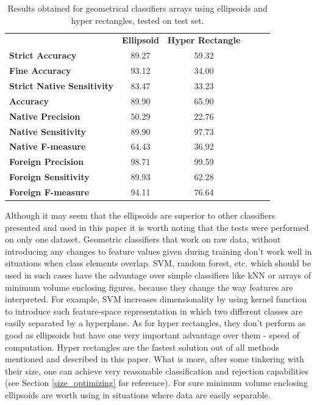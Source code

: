 \begin{table}[htp]
	\centering
	\caption{Results obtained for geometrical classifiers arrays using ellipsoids and hyper rectangles, tested on test set.}
	\label{ellipsoid_arrays_results_test}
	\begin{tabular}{l|c|c|lll}
		\cline{2-3}
		& \multicolumn{1}{l|}{\textbf{Ellipsoid}} & \textbf{Hyper Rectangle} &  &  &  \\ \cline{1-3}
		\multicolumn{1}{|l|}{\textbf{Strict Accuracy}}           & 89.27 & 59.32 \\ \cline{1-3}
		\multicolumn{1}{|l|}{\textbf{Fine Accuracy}}             & 93.12 & 34.00 \\ \cline{1-3}
		\multicolumn{1}{|l|}{\textbf{Strict Native Sensitivity}} & 83.47 & 33.23 \\ \cline{1-3}
		\multicolumn{1}{|l|}{\textbf{Accuracy}}                  & 89.90 & 65.90 \\ \cline{1-3}
		\multicolumn{1}{|l|}{\textbf{Native Precision}}          & 50.29 & 22.76 \\ \cline{1-3}
		\multicolumn{1}{|l|}{\textbf{Native Sensitivity}}        & 89.90 & 97.73 \\ \cline{1-3}
		\multicolumn{1}{|l|}{\textbf{Native F-measure}}          & 64.43 & 36.92 \\ \cline{1-3}
		\multicolumn{1}{|l|}{\textbf{Foreign Precision}}         & 98.71 & 99.59 \\ \cline{1-3}
		\multicolumn{1}{|l|}{\textbf{Foreign Sensitivity}}       & 89.93 & 62.28 \\ \cline{1-3}
		\multicolumn{1}{|l|}{\textbf{Foreign F-measure}}         & 94.11 & 76.64 \\ \cline{1-3}
	\end{tabular}
\end{table}

Although it may seem that the ellipsoids are superior to other classifiers presented and used in this paper it is worth noting that the tests were performed on only one dataset. Geometric classifiers that work on raw data, without introducing any changes to feature values given during training don't work well in situations when class elements overlap. SVM, random forest, etc. which should be used in such cases have the advantage over simple classifiers like kNN or arrays of minimum volume enclosing figures, because they change the way features are interpreted. For example, SVM increases dimensionality by using kernel function to introduce such feature-space representation in which two different classes are easily separated by a hyperplane. As for hyper rectangles, they don't perform as good as ellipsoids but have one very important advantage over them - speed of computation. Hyper rectangles are the fastest solution out of all methods mentioned and described in this paper. What is more, after some tinkering with their size, one can achieve very reasonable classification and rejection capabilities (see Section \ref{size_optimizing} for reference). For sure minimum volume enclosing ellipsoids are worth using in situations where data are easily separable.

